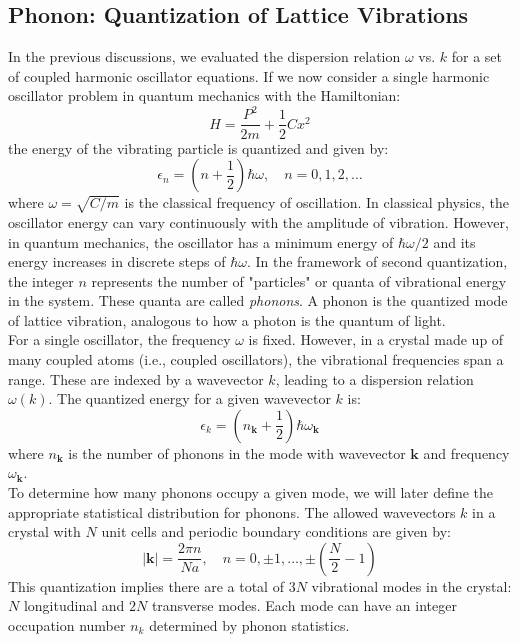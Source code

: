 \subsection{Phonon: Quantization of Lattice Vibrations}
In the previous discussions, we evaluated the dispersion relation \( \omega \) vs. \( k \) for a set of coupled harmonic oscillator equations. If we now consider a single harmonic oscillator problem in quantum mechanics with the Hamiltonian:
\begin{equation}
	H = \frac{P^2}{2m} + \frac{1}{2} C x^2
\end{equation}
\noindent
the energy of the vibrating particle is quantized and given by:
\begin{equation}
	\epsilon_n = \left(n + \frac{1}{2}\right)\hbar\omega, \quad n = 0, 1, 2, \dots
\end{equation}
\noindent
where \( \omega = \sqrt{C/m} \) is the classical frequency of oscillation.
In classical physics, the oscillator energy can vary continuously with the amplitude of vibration. However, in quantum mechanics, the oscillator has a minimum energy of \( \hbar \omega / 2 \) and its energy increases in discrete steps of \( \hbar \omega \).
In the framework of second quantization, the integer \( n \) represents the number of "particles" or quanta of vibrational energy in the system. These quanta are called \textit{phonons}. A phonon is the quantized mode of lattice vibration, analogous to how a photon is the quantum of light.\\
For a single oscillator, the frequency \( \omega \) is fixed. However, in a crystal made up of many coupled atoms (i.e., coupled oscillators), the vibrational frequencies span a range. These are indexed by a wavevector \( k \), leading to a dispersion relation \( \omega(k) \). The quantized energy for a given wavevector \( k \) is:
\begin{equation}
	\epsilon_k = \left(n_\mathbf{k} + \frac{1}{2}\right) \hbar \omega_\mathbf{k}
\end{equation}
\noindent
where \( n_\mathbf{k} \) is the number of phonons in the mode with wavevector \( \mathbf{k} \) and frequency \( \omega_\mathbf{k} \).\\
To determine how many phonons occupy a given mode, we will later define the appropriate statistical distribution for phonons.
The allowed wavevectors \( k \) in a crystal with \( N \) unit cells and periodic boundary conditions are given by:
\begin{equation}
	|\mathbf{k}| = \frac{2\pi n}{Na}, \quad n = 0, \pm 1, \dots, \pm \left(\frac{N}{2} - 1\right)
\end{equation}
\noindent
This quantization implies there are a total of \( 3N \) vibrational modes in the crystal: \( N \) longitudinal and \( 2N \) transverse modes. Each mode can have an integer occupation number \( n_k \) determined by phonon statistics.


